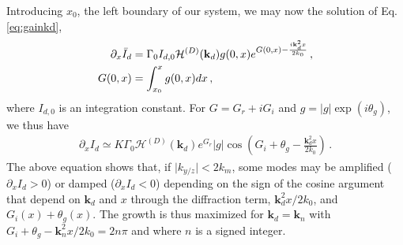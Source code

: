 \documentclass[
 reprint,
 amsmath,amssymb,
 aps,
]{revtex4-1}
\begin{document}
Introducing $x_0$, the left boundary of our system, we may now the solution of Eq. \eqref{eq:gainkd}, 
\begin{align}
\partial_x\Bar{I}_d &=\Gamma_0 I_{d,0} \mathcal{H}^{(D)}(\mathbf{k}_d) g(0,x)
e^{G(0,x)-\frac{i\mathbf{k}_d^2x }{2k_0}} \, ,\nonumber\\
G(0,x)&=\int_{x_0}^{x}g(0,x) dx \, , \label{eq:dxidkd}
\end{align}
where $I_{d,0}$ is an integration constant. 
For $G=G_r+iG_i$ and $g=\vert g \vert \exp(i\theta_g)$, we thus have
\begin{align}
\partial_x I_d \simeq K\Gamma_0 \mathcal{H}^{(D)}(\mathbf{k}_d)  e^{ G_r} \vert g \vert \cos\left( G_i +\theta_g-\frac{\mathbf{k}_d^2 x }{2k_0} \right) \, . \label{eq:dxidkdf}
\end{align} 
The above equation shows that, if $\vert k_{y/z}\vert <2k_m$, some modes may be amplified ($\partial_x I_d>0$) or damped ($\partial_x I_d<0$) depending on the sign of the cosine argument that depend on $\mathbf{k}_d$ and $x$ through the diffraction term, $\mathbf{k}_d^2 x/2k_0$, and $ G_i(x)+ \theta_g(x)$. 
The growth is thus maximized for $\mathbf{k}_d=\mathbf{k}_n$ with $G_i+ \theta_g-\mathbf{k}_n^2 x /2k_0 = 2n\pi$ and where $n$ is a signed integer. 
\end{document}
